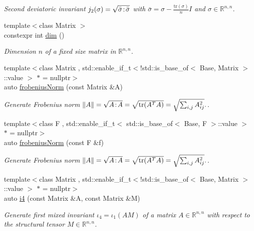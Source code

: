 \begin{DoxyCompactItemize}
\begin{DoxyCompactList}\small\item\em Second deviatoric invariant $ j_2(\sigma)=\sqrt{\bar\sigma\negthinspace:\negthinspace\bar\sigma} $ with $\bar\sigma = \sigma - \frac{\mathrm{tr}(\sigma)}{n}I$ and $\sigma\in\mathbb{R}^{n,n}$. \end{DoxyCompactList}\item 
{\footnotesize template$<$class Matrix $>$ }\\constexpr int \hyperlink{namespaceFunG_1_1LinearAlgebra_a13a029820c29d530274ae94968d642d4}{dim} ()
\begin{DoxyCompactList}\small\item\em Dimension $n$ of a fixed size matrix in $\mathbb{R}^{n,n}$. \end{DoxyCompactList}\item 
{\footnotesize template$<$class Matrix , std\+::enable\+\_\+if\+\_\+t$<$!std\+::is\+\_\+base\+\_\+of$<$ Base, Matrix $>$\+::value $>$ $\ast$  = nullptr$>$ }\\auto \hyperlink{group__LinearAlgebraGroup_gaa893e7d667dde98d2b119ca004745186}{frobenius\+Norm} (const Matrix \&A)
\begin{DoxyCompactList}\small\item\em Generate Frobenius norm $ \|A\| = \sqrt{A\negthinspace : \negthinspace A }= \sqrt{\mathrm{tr}(A^TA)} = \sqrt{\sum_{i,j} A_{ij}^2}. $. \end{DoxyCompactList}\item 
{\footnotesize template$<$class F , std\+::enable\+\_\+if\+\_\+t$<$ std\+::is\+\_\+base\+\_\+of$<$ Base, F $>$\+::value $>$ $\ast$  = nullptr$>$ }\\auto \hyperlink{group__LinearAlgebraGroup_gafa2f358f9310cecb787620ad8ec460a6}{frobenius\+Norm} (const F \&f)
\begin{DoxyCompactList}\small\item\em Generate Frobenius norm $ \|A\| = \sqrt{A\negthinspace : \negthinspace A }= \sqrt{\mathrm{tr}(A^TA)} = \sqrt{\sum_{i,j} A_{ij}^2}. $. \end{DoxyCompactList}\item 
{\footnotesize template$<$class Matrix , std\+::enable\+\_\+if\+\_\+t$<$!std\+::is\+\_\+base\+\_\+of$<$ Base, Matrix $>$\+::value $>$ $\ast$  = nullptr$>$ }\\auto \hyperlink{group__InvariantGroup_ga1898785172ecce11af0c27e54d555009}{i4} (const Matrix \&A, const Matrix \&M)
\begin{DoxyCompactList}\small\item\em Generate first mixed invariant $ \iota_4=\iota_1(AM) $ of a matrix $A\in\mathbb{R}^{n,n}$ with respect to the structural tensor $M\in\mathbb{R}^{n,n}$. \end{DoxyCompactList}\item 

\end{DoxyCompactItemize}
